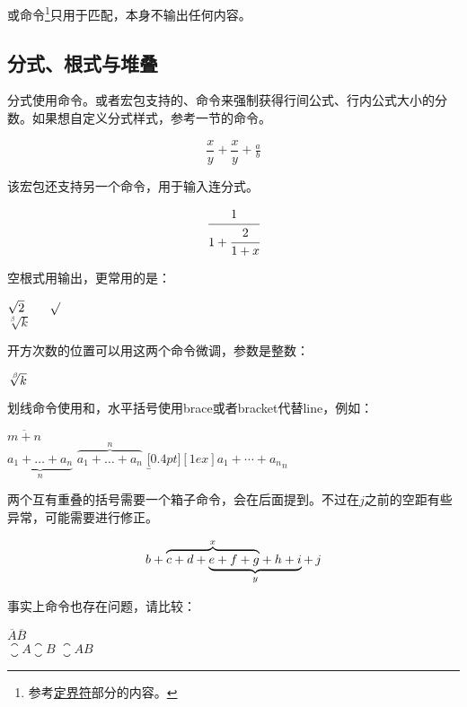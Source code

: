 或命令\footnote{参考\hyperref[subsec:delimiter]{定界符}部分的内容。}只用于匹配，本身不输出任何内容。

\subsection{分式、根式与堆叠}
分式使用命令。或者宏包支持的、命令来强制获得行间公式、行内公式大小的分数。如果想自定义分式样式，参考一节的命令。
\begin{codeshow}
\[\frac{x}{y}+\dfrac{x}{y}
+\tfrac{a}{b}\]
\end{codeshow}

该宏包还支持另一个命令，用于输入连分式。
\begin{codeshow}
\[\cfrac{1}{1+\cfrac{2}{1+x}}\]
\end{codeshow}

空根式用输出，更常用的是：
\begin{codeshow}
$\sqrt{2} \qquad \surd$\\
$\sqrt[\beta]{k}$
\end{codeshow}

开方次数的位置可以用这两个命令微调，参数是整数：
\begin{codeshow}
$\sqrt[\leftroot{-2}\uproot{2} \beta]{k}$
\end{codeshow}

划线命令使用和，水平括号使用brace或者bracket代替line，例如：

\begin{codeshow}
$\overline{m+n}$ \\
$\underbrace{a_1+\ldots+a_n}_{n}$
$\overbrace{a_1+\ldots+a_n}^{n}$
$\underbracket[0.4pt][1ex]
  {a_1+\cdots+a_n}_n$
\end{codeshow}

两个互有重叠的括号需要一个箱子命令，会在后面提到。不过在$j$之前的空距有些异常，可能需要\latexline{,}进行修正。
\begin{codeshow}
\[b+\rlap{$\overbrace{\phantom{
  c+d+e+f+g}}^x$}c+d+\underbrace{
  e+f+g+h+i}_y+\,j \]
\end{codeshow}

事实上命令也存在问题，请比较：

\begin{codeshow}
$\overline{A}\overline{B}$ \\
$\closure{A}\closure{B}$
$\closure{AB}$
\end{codeshow}

